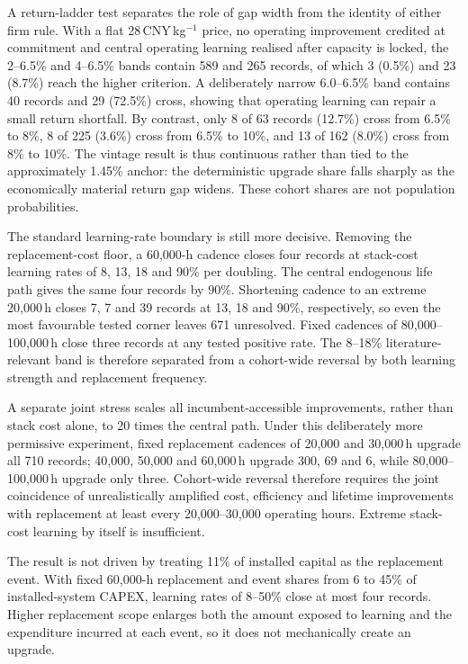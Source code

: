 \documentclass[11pt,a4paper]{article}
\begin{document}
A return-ladder test separates the role of gap width from the identity of either firm rule. With a flat 28\,CNY\,kg$^{-1}$ price, no operating improvement credited at commitment and central operating learning realised after capacity is locked, the 2--6.5\% and 4--6.5\% bands contain 589 and 265 records, of which 3 (0.5\%) and 23 (8.7\%) reach the higher criterion. A deliberately narrow 6.0--6.5\% band contains 40 records and 29 (72.5\%) cross, showing that operating learning can repair a small return shortfall. By contrast, only 8 of 63 records (12.7\%) cross from 6.5\% to 8\%, 8 of 225 (3.6\%) cross from 6.5\% to 10\%, and 13 of 162 (8.0\%) cross from 8\% to 10\%. The vintage result is thus continuous rather than tied to the approximately 1.45\% anchor: the deterministic upgrade share falls sharply as the economically material return gap widens. These cohort shares are not population probabilities.

The standard learning-rate boundary is still more decisive. Removing the replacement-cost floor, a 60,000-h cadence closes four records at stack-cost learning rates of 8, 13, 18 and 90\% per doubling. The central endogenous life path gives the same four records by 90\%. Shortening cadence to an extreme 20,000\,h closes 7, 7 and 39 records at 13, 18 and 90\%, respectively, so even the most favourable tested corner leaves 671 unresolved. Fixed cadences of 80,000--100,000\,h close three records at any tested positive rate. The 8--18\% literature-relevant band is therefore separated from a cohort-wide reversal by both learning strength and replacement frequency.

A separate joint stress scales all incumbent-accessible improvements, rather than stack cost alone, to 20 times the central path. Under this deliberately more permissive experiment, fixed replacement cadences of 20,000 and 30,000\,h upgrade all 710 records; 40,000, 50,000 and 60,000\,h upgrade 300, 69 and 6, while 80,000--100,000\,h upgrade only three. Cohort-wide reversal therefore requires the joint coincidence of unrealistically amplified cost, efficiency and lifetime improvements with replacement at least every 20,000--30,000 operating hours. Extreme stack-cost learning by itself is insufficient.

The result is not driven by treating 11\% of installed capital as the replacement event. With fixed 60,000-h replacement and event shares from 6 to 45\% of installed-system CAPEX, learning rates of 8--50\% close at most four records. Higher replacement scope enlarges both the amount exposed to learning and the expenditure incurred at each event, so it does not mechanically create an upgrade.
\end{document}
